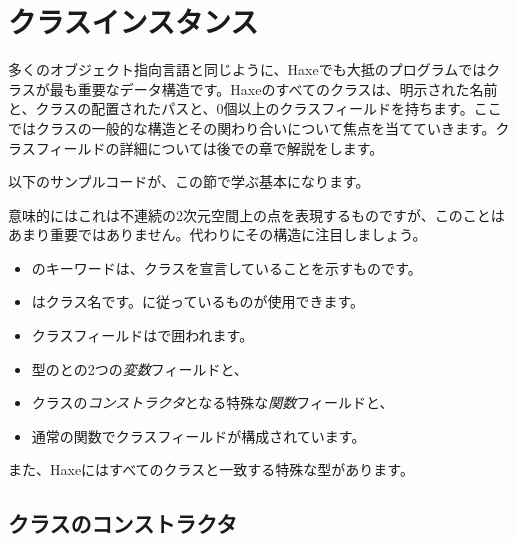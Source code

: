 \section{クラスインスタンス}
\label{types-class-instance}


多くのオブジェクト指向言語と同じように、Haxeでも大抵のプログラムではクラスが最も重要なデータ構造です。Haxeのすべてのクラスは、明示された名前と、クラスの配置されたパスと、0個以上のクラスフィールドを持ちます。ここではクラスの一般的な構造とその関わり合いについて焦点を当てていきます。クラスフィールドの詳細については後での章で解説をします。

以下のサンプルコードが、この節で学ぶ基本になります。


意味的にはこれは不連続の2次元空間上の点を表現するものですが、このことはあまり重要ではありません。代わりにその構造に注目しましょう。

\begin{itemize}
	\item {}のキーワードは、クラスを宣言していることを示すものです。
	\item {}はクラス名です。に従っているものが使用できます。
	\item クラスフィールドは\expr{$\left\{\right\}$}で囲われます。
	\item {}型のとの2つの\emph{変数}フィールドと、
	\item クラスの\emph{コンストラクタ}となる特殊な\emph{関数}フィールドと、
	\item 通常の関数でクラスフィールドが構成されています。
\end{itemize}

また、Haxeにはすべてのクラスと一致する特殊な型があります。


\subsection{クラスのコンストラクタ}
\label{types-class-constructor}

